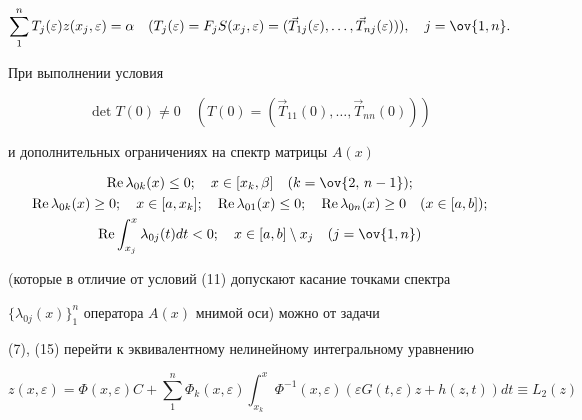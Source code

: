 \begin{equation} 


\sum^n_1T_j(\varepsilon)z(x_j,\varepsilon)=\alpha\quad 


(T_j(\varepsilon)=F_j S(x_j,\varepsilon)= 


(\Vec T_{1j}(\varepsilon),\dotsc,\Vec T_{nj}(\varepsilon))), 


\quad j=\ov{1,n}. 


\end{equation} 


При выполнении условия 


\begin{equation} 


\det T(0)\ne 0\quad (T(0)=(\Vec T_{11}(0),\dotsc,\Vec T_{nn}(0)))


\end{equation} 


и дополнительных ограничениях на спектр матрицы $A(x)$ 


\begin{gather} 


\re\lambda_{0k}(x)\le 0;\quad x\in[x_k,\beta]\quad 


(k=\ov{2,\,n-1});\notag \\ 


\re\lambda_{0k}(x)\ge 0;\quad x\in[a,x_k];\quad 


\re\lambda_{01}(x)\le 0;\quad 


\re\lambda_{0n}(x)\ge 0\quad (x\in[a,b]);\\ 


\re\int^x_{x_j}\lambda_{0j}(t)dt<0;\quad x\in[a,b]\setminus x_j 


\quad (j=\ov{1,n})\notag 


\end{gather} 


(которые в отличие от условий (11) допускают касание точками спектра 


$\{\lambda_{0j}(x)\}^n_1$ оператора $A(x)$ мнимой оси) можно от задачи 


(7), (15) перейти к эквивалентному нелинейному интегральному уравнению 


\begin{equation} 


z(x,\varepsilon)=\Phi(x,\varepsilon)C+\sum^n_1 


\Phi_k(x,\varepsilon)\int^x_{x_k}\Phi^{-1}(x,\varepsilon) 


(\varepsilon G(t,\varepsilon)z+h(z,t))dt\equiv L_2(z) 


\end{equation} 


